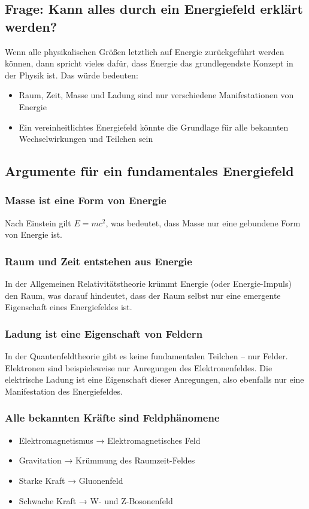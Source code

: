 \documentclass{article}
\begin{document}
	\subsection{Frage: Kann alles durch ein Energiefeld erklärt werden?}
	
	Wenn alle physikalischen Größen letztlich auf Energie zurückgeführt werden können, dann spricht vieles dafür, dass Energie das grundlegendste Konzept in der Physik ist. Das würde bedeuten:
	
	\begin{itemize}
		\item Raum, Zeit, Masse und Ladung sind nur verschiedene Manifestationen von Energie
		\item Ein vereinheitlichtes Energiefeld könnte die Grundlage für alle bekannten Wechselwirkungen und Teilchen sein
	\end{itemize}
	
	\subsection{Argumente für ein fundamentales Energiefeld}
	
	\subsubsection{Masse ist eine Form von Energie}
	Nach Einstein gilt $E = mc^2$, was bedeutet, dass Masse nur eine gebundene Form von Energie ist.
	
	\subsubsection{Raum und Zeit entstehen aus Energie}
	In der Allgemeinen Relativitätstheorie krümmt Energie (oder Energie-Impuls) den Raum, was darauf hindeutet, dass der Raum selbst nur eine emergente Eigenschaft eines Energiefeldes ist.
	
	\subsubsection{Ladung ist eine Eigenschaft von Feldern}
	In der Quantenfeldtheorie gibt es keine fundamentalen Teilchen – nur Felder. Elektronen sind beispielsweise nur Anregungen des Elektronenfeldes. Die elektrische Ladung ist eine Eigenschaft dieser Anregungen, also ebenfalls nur eine Manifestation des Energiefeldes.
	
	\subsubsection{Alle bekannten Kräfte sind Feldphänomene}
	\begin{itemize}
		\item Elektromagnetismus → Elektromagnetisches Feld
		\item Gravitation → Krümmung des Raumzeit-Feldes
		\item Starke Kraft → Gluonenfeld
		\item Schwache Kraft → W- und Z-Bosonenfeld
	\end{itemize}
	
\end{document}
